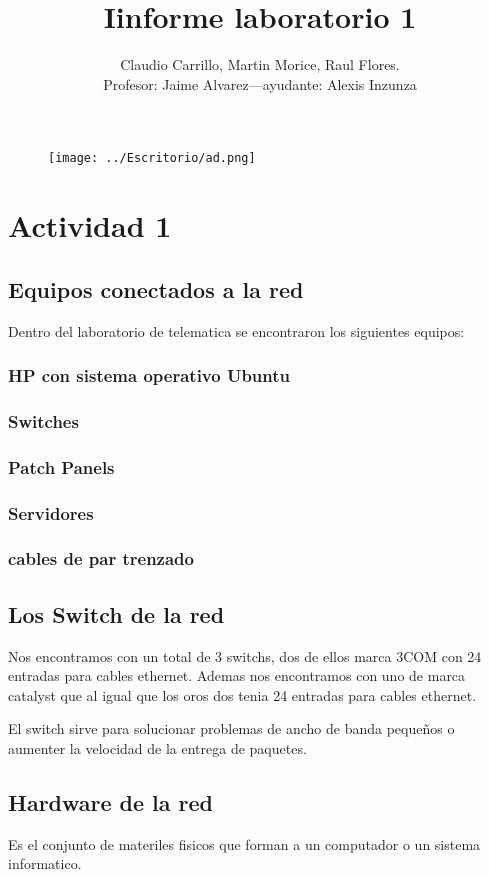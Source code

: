 \documentclass[11pt,a4paper]{report}
\author{Claudio Carrillo, Martin Morice, Raul Flores. \\ Profesor: Jaime Alvarez---ayudante: Alexis Inzunza}
\title{Iinforme laboratorio 1}
\begin{document}
\begin{figure}[hbtp]
\texttt{[image: ../Escritorio/ad.png]}
\end{figure}

\maketitle
\section{Actividad 1}
\begin{multicols}{2}
\subsection{Equipos conectados a la red}
Dentro del laboratorio de telematica se encontraron los siguientes equipos:
\subsubsection{HP con sistema operativo Ubuntu}
\subsubsection{Switches}
\subsubsection{Patch Panels}
\subsubsection{Servidores}
\subsubsection{cables de par trenzado}

\subsection{Los Switch de la red}
Nos encontramos con un total de 3 switchs, dos de ellos marca 3COM con 24 entradas para cables ethernet. Ademas nos encontramos con uno de marca catalyst que al igual que los oros dos tenia 24 entradas para cables ethernet.

El switch sirve para solucionar problemas de ancho de banda pequeños o aumenter la velocidad de la entrega de paquetes.

\subsection{Hardware de la red}
Es el conjunto de materiles fisicos que forman a un computador o un sistema informatico.


\end{multicols}
\end{document}

